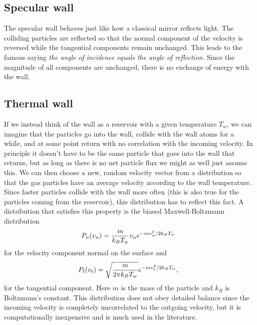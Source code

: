 \subsection{Specular wall}
The specular wall behaves just like how a classical mirror reflects light. The colliding particles are reflected so that the normal component of the velocity is reversed while the tangential components remain unchanged. This leads to the famous saying \textit{the angle of incidence equals the angle of reflection}. Since the magnitude of all components are unchanged, there is no exchange of energy with the wall. 

\subsection{Thermal wall}
If we instead think of the wall as a reservoir with a given temperature $T_w$, we can imagine that the particles go into the wall, collide with the wall atoms for a while, and at some point return with no correlation with the incoming velocity. In principle it doesn't have to be the same particle that goes into the wall that returns, but as long as there is no net particle flux we might as well just assume this. We can then choose a new, random velocity vector from a distribution so that the gas particles have an average velocity according to the wall temperature. Since faster particles collide with the wall more often (this is also true for the particles coming from the reservoir), this distribution has to reflect this fact. A distribution that satisfies this property is the biased Maxwell-Boltzmann distribution\cite{alexander1997direct}
\begin{align}
	P_n(v_n) = {m\over k_BT_w}v_n e^{-mv_n^2/2k_BT_w}
\end{align}
for the velocity component normal on the surface and
\begin{align}
	P_t(v_t) = \sqrt{m\over 2\pi k_BT_w}e^{-mv_t^2/2k_BT_w},
\end{align}
for the tangential component. Here $m$ is the mass of the particle and $k_B$ is Boltzmann's constant. This distribution does not obey detailed balance since the incoming velocity is completely uncorrelated to the outgoing velocity, but it is computationally inexpensive and is much used in the literature. 
